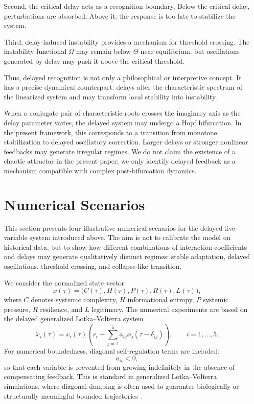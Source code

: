 \documentclass[11pt]{article}
\begin{document}
Second, the critical delay acts as a recognition boundary. Below the critical delay, perturbations are absorbed. Above it, the response is too late to stabilize the system.

Third, delay-induced instability provides a mechanism for threshold crossing. The instability functional $\Omega$ may remain below $\Theta$ near equilibrium, but oscillations generated by delay may push it above the critical threshold.

Thus, delayed recognition is not only a philosophical or interpretive concept. It has a precise dynamical counterpart: delays alter the characteristic spectrum of the linearized system and may transform local stability into instability.



 
 When a conjugate pair of characteristic roots crosses the imaginary axis as the delay parameter varies, the delayed system may undergo a Hopf bifurcation. In the present framework, this corresponds to a transition from monotone stabilization to delayed oscillatory correction. Larger delays or stronger nonlinear feedbacks may generate irregular regimes. We do not claim the existence of a chaotic attractor in the present paper; we only identify delayed feedback as a mechanism compatible with complex post-bifurcation dynamics.



\section{Numerical Scenarios}

This section presents four illustrative numerical scenarios for the delayed five-variable system introduced above. The aim is not to calibrate the model on historical data, but to show how different combinations of interaction coefficients and delays may generate qualitatively distinct regimes: stable adaptation, delayed oscillations, threshold crossing, and collapse-like transition.

We consider the normalized state vector
\[
x(\tau)=\big(C(\tau),H(\tau),P(\tau),R(\tau),L(\tau)\big),
\]
where \(C\) denotes systemic complexity, \(H\) informational entropy, \(P\) systemic pressure, \(R\) resilience, and \(L\) legitimacy. The numerical experiments are based on the delayed generalized Lotka--Volterra system
\[
\dot{x}_i(\tau)
=
x_i(\tau)
\left(
r_i
+
\sum_{j=1}^{5}a_{ij}x_j(\tau-\delta_{ij})
\right),
\qquad i=1,\ldots,5.
\]
For numerical boundedness, diagonal self-regulation terms are included:
\[
a_{ii}<0,
\]
so that each variable is prevented from growing indefinitely in the absence of compensating feedback. This is standard in generalized Lotka--Volterra simulations, where diagonal damping is often used to guarantee biologically or structurally meaningful bounded trajectories \cite{saeedian2022delay,liu2023feasibility}.
\end{document}
